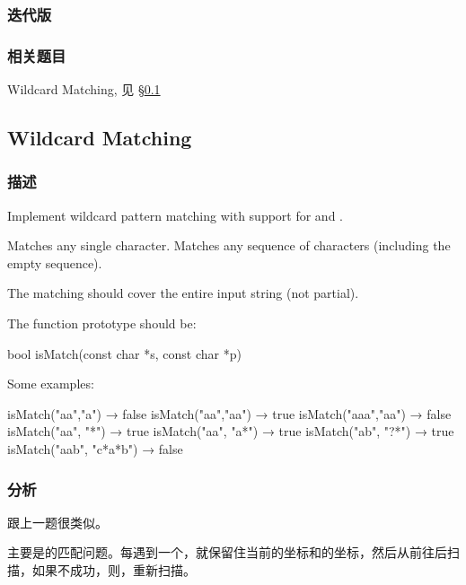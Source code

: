 \subsubsection{迭代版}
\begin{Code}
	
\end{Code}


\subsubsection{相关题目}
\begindot
\item Wildcard Matching, 见 \S \ref{sec:wildcard-matching}
\myenddot


\subsection{Wildcard Matching} %
\label{sec:wildcard-matching}


\subsubsection{描述}
Implement wildcard pattern matching with support for  and .

 Matches any single character.
 Matches any sequence of characters (including the empty sequence).

The matching should cover the entire input string (not partial).

The function prototype should be:
\begin{Code}
	bool isMatch(const char *s, const char *p)
\end{Code}

Some examples:
\begin{Code}
	isMatch("aa","a") → false
	isMatch("aa","aa") → true
	isMatch("aaa","aa") → false
	isMatch("aa", "*") → true
	isMatch("aa", "a*") → true
	isMatch("ab", "?*") → true
	isMatch("aab", "c*a*b") → false
\end{Code}


\subsubsection{分析}
跟上一题很类似。

主要是的匹配问题。每遇到一个，就保留住当前的坐标和的坐标，然后从前往后扫描，如果不成功，则，重新扫描。


